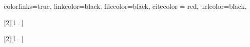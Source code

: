 \newcommand\blankPage
{
    \afterpage{\blankpage}
}

\hypersetup
{
     colorlinks=true,
     linkcolor=black,
     filecolor=black,
     citecolor = red,      
     urlcolor=black,
}


\usepackage{xargs} 
[2][1=]{}

[2][1=]{}

\renewcommand\arraystretch{1.25}

\renewcommand{\vec}[1]{\boldsymbol{\mathbf{#1}}}
\newcommand{\ten}[1]  {\boldsymbol{\mathbf{#1}}}
\newcommand{\dif}{\text{d}}
\newcommand{\grad}{\bm{\nabla}}
\newcommand{\tr}{\text{tr}}
\newcommand{\transpose}{\mathrm{T}}
\newcommand{\sign}{\mathrm{sign}}
\newcommand{\gvar}{\vec{\phi}}
\newcommand{\nrm}[1]{\tilde{#1}}

\newcommand*\mystrut[1]{\vrule width0pt height0pt depth#1\relax}

\DeclareSIUnit{\m}{\metre}
\DeclareSIUnit{\s}{\second}
\DeclareSIUnit{\mm}{\metre\metre}
\DeclareSIUnit{\nmm}{\newton\mm} 
\DeclareSIUnit{\mpa}{\mega\pascal}
\DeclareSIUnit{\gpa}{\giga\pascal}


\makeatletter
\newcommand{\vast}{\bBigg@{4}}
\newcommand{\Vast}{\bBigg@{5}}
\makeatother

\newcommand\implicitCellColor{\cellcolor{blue!50}}

\newcommand\implicitCellColorTikz[1]{\tikz[overlay, remember picture,baseline=-\the\dimexpr\fontdimen22\textfont2\relax]\node[rectangle,fill=blue!50,sharp corners,fill opacity = 0.2,text opacity =1] {$#1$};} 

